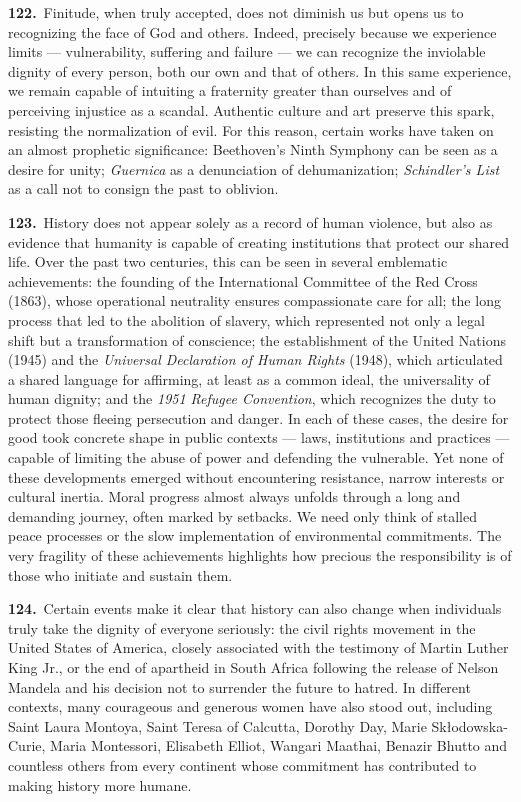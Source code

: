 \documentclass{article}
\begin{document}
\textbf{122.}\ Finitude, when truly accepted, does not diminish us but opens us to recognizing the face of God and others. Indeed, precisely because we experience limits --- vulnerability, suffering and failure --- we can recognize the inviolable dignity of every person, both our own and that of others. In this same experience, we remain capable of intuiting a fraternity greater than ourselves and of perceiving injustice as a scandal. Authentic culture and art preserve this spark, resisting the normalization of evil. For this reason, certain works have taken on an almost prophetic significance: Beethoven's Ninth Symphony can be seen as a desire for unity; \emph{Guernica} as a denunciation of dehumanization; \emph{Schindler's List} as a call not to consign the past to oblivion.

\textbf{123.}\ History does not appear solely as a record of human violence, but also as evidence that humanity is capable of creating institutions that protect our shared life. Over the past two centuries, this can be seen in several emblematic achievements: the founding of the International Committee of the Red Cross (1863), whose operational neutrality ensures compassionate care for all; the long process that led to the abolition of slavery, which represented not only a legal shift but a transformation of conscience; the establishment of the United Nations (1945) and the \emph{Universal Declaration of Human Rights} (1948), which articulated a shared language for affirming, at least as a common ideal, the universality of human dignity; and the \emph{1951 Refugee Convention}, which recognizes the duty to protect those fleeing persecution and danger. In each of these cases, the desire for good took concrete shape in public contexts --- laws, institutions and practices --- capable of limiting the abuse of power and defending the vulnerable. Yet none of these developments emerged without encountering resistance, narrow interests or cultural inertia. Moral progress almost always unfolds through a long and demanding journey, often marked by setbacks. We need only think of stalled peace processes or the slow implementation of environmental commitments. The very fragility of these achievements highlights how precious the responsibility is of those who initiate and sustain them.

\textbf{124.}\ Certain events make it clear that history can also change when individuals truly take the dignity of everyone seriously: the civil rights movement in the United States of America, closely associated with the testimony of Martin Luther King Jr., or the end of apartheid in South Africa following the release of Nelson Mandela and his decision not to surrender the future to hatred. In different contexts, many courageous and generous women have also stood out, including Saint Laura Montoya, Saint Teresa of Calcutta, Dorothy Day, Marie Skłodowska-Curie, Maria Montessori, Elisabeth Elliot, Wangari Maathai, Benazir Bhutto and countless others from every continent whose commitment has contributed to making history more humane.
\end{document}
